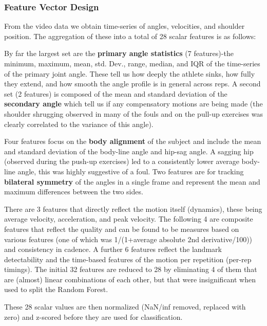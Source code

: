 \documentclass[conference]{IEEEtran}
\begin{document}
\subsubsection{Feature Vector Design}
From the video data we obtain time-series of angles, velocities, and shoulder position. The aggregation of these into a total of 28 scalar features is as follows:

By far the largest set are the \textbf{primary angle statistics} (7 features)-the minimum, maximum, mean, std. Dev., range, median, and IQR of the time-series of the primary joint angle. These tell us how deeply the athlete sinks, how fully they extend, and how smooth the angle profile is in general across reps. A second set (2 features) is composed of the mean and standard deviation of the \textbf{secondary angle} which tell us if any compensatory motions are being made (the shoulder shrugging observed in many of the fouls and on the pull-up exercises was clearly correlated to the variance of this angle).

Four features focus on the \textbf{body alignment} of the subject and include the mean and standard deviation of the body-line angle and hip-sag angle. A sagging hip (observed during the push-up exercises) led to a consistently lower average body-line angle, this was highly suggestive of a foul. Two features are for tracking \textbf{bilateral symmetry} of the angles in a single frame and represent the mean and maximum differences between the two sides.

There are 3 features that directly reflect the motion itself (dynamics), these being average velocity, acceleration, and peak velocity. The following 4 are composite features that reflect the quality and can be found to be measures based on various features (one of which was 1/(1+average absolute 2nd derivative/100)) and consistency in cadence. A further 6 features reflect the landmark detectability and the time-based features of the motion per repetition (per-rep timings). The initial 32 features are reduced to 28 by eliminating 4 of them that are (almost) linear combinations of each other, but that were insignificant when used to split the Random Forest.

These 28 scalar values are then normalized (NaN/inf removed, replaced with zero) and z-scored before they are used for classification.
\end{document}
